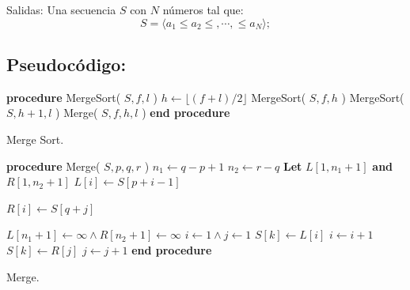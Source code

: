 \documentclass[12pt,spanish]{article}
\theoremstyle{definition}
\begin{document}
Salidas: Una secuencia $S$ con $N$ números tal que:
\begin{equation}
     S =  \left.\langle  a_{1} \le a_{2} \le, \cdots, \le a_{N} \rangle\right.;
\end{equation}

\subsection{Pseudocódigo:}{}

\begin{algorithm}
\begin{algorithmic}[1]
\STATE \textbf{procedure} MergeSort( $S, f, l$ ) 
    \STATE $h \leftarrow \lfloor (f+l)/2 \rfloor$
    \STATE MergeSort( $S, f, h$ ) 
    \STATE MergeSort( $S, h+1, l$ ) 
    \STATE Merge( $S, f, h,l$ ) 
\ENDIF
\STATE \textbf{end procedure}
\caption{Merge Sort.}
\end{algorithmic}
\end{algorithm}

\begin{algorithm}
\begin{algorithmic}[1]
\STATE \textbf{procedure} Merge( $S, p, q, r$ ) 
\STATE $n_{1} \leftarrow q-p+1$
\STATE $n_{2} \leftarrow r-q$
\STATE \textbf{Let} $L[1,n_{1}+1]$ \textbf{and} $R[1,n_{2}+1]$
    \STATE $L[i] \leftarrow S[p+i-1]$
\ENDFOR

    \STATE $R[i] \leftarrow S[q+j]$
\ENDFOR

\STATE $L[n_{1}+1] \leftarrow \infty \wedge R[n_{2}+1] \leftarrow \infty$
\STATE $i\leftarrow 1 \wedge j \leftarrow 1 $
        \STATE $S[k] \leftarrow L[i]$
        \STATE $i \leftarrow i+1$
    \ELSE
        \STATE $S[k] \leftarrow R[j]$
        \STATE $j \leftarrow j+1$
    \ENDIF
\ENDFOR
\STATE \textbf{end procedure}
\caption{Merge.}
\end{algorithmic}
\end{algorithm}

\clearpage
\end{document}
